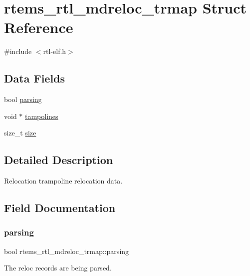 \hypertarget{structrtems__rtl__mdreloc__trmap}{}\section{rtems\+\_\+rtl\+\_\+mdreloc\+\_\+trmap Struct Reference}
\label{structrtems__rtl__mdreloc__trmap}


{\ttfamily \#include $<$rtl-\/elf.\+h$>$}

\subsection*{Data Fields}
\begin{DoxyCompactItemize}
\item 
bool \mbox{\hyperlink{structrtems__rtl__mdreloc__trmap_a1665073293f904fa813c65e43628c85d}{parsing}}
\item 
void $\ast$ \mbox{\hyperlink{structrtems__rtl__mdreloc__trmap_a1fb87f69a2d2e50401ab0450f9c372d3}{tampolines}}
\item 
size\+\_\+t \mbox{\hyperlink{structrtems__rtl__mdreloc__trmap_aa53065897db1aae6460556a88036476d}{size}}
\end{DoxyCompactItemize}


\subsection{Detailed Description}
Relocation trampoline relocation data. 

\subsection{Field Documentation}
\mbox{\label{structrtems__rtl__mdreloc__trmap_a1665073293f904fa813c65e43628c85d}} 
\subsubsection{\texorpdfstring{parsing}{parsing}}
{\footnotesize\ttfamily bool rtems\+\_\+rtl\+\_\+mdreloc\+\_\+trmap\+::parsing}

The reloc records are being parsed. \mbox{\label{structrtems__rtl__mdreloc__trmap_aa53065897db1aae6460556a88036476d}} 
